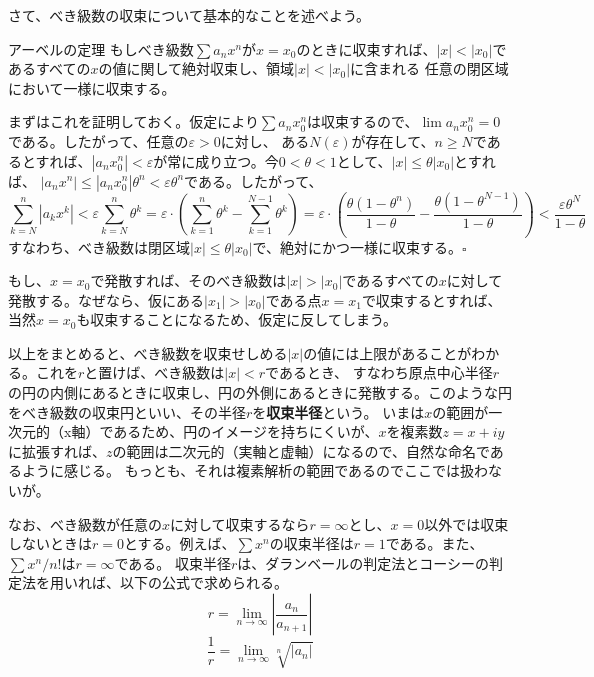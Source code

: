 \documentclass[a4j,dvipdfmx]{jsarticle}
\begin{document}
                さて、べき級数の収束について基本的なことを述べよう。
                \begin{itembox}{アーベルの定理}
                    もしべき級数$\sum a_nx^n$が$x=x_0$のときに収束すれば、$|x|<|x_0|$であるすべての$x$の値に関して絶対収束し、領域$|x|<|x_0|$に含まれる
                    任意の閉区域において一様に収束する。
                \end{itembox}
                まずはこれを証明しておく。仮定により$\sum a_nx_0^n$は収束するので、$\lim a_nx_0^n=0$である。したがって、任意の$\varepsilon>0$に対し、
                ある$N(\varepsilon)$が存在して、$n\geq N$であるとすれば、$|a_nx_0^n|<\varepsilon$が常に成り立つ。今$0<\theta<1$として、$|x|\leq \theta|x_0|$とすれば、
                $|a_nx^n|\leq |a_nx_0^n|\theta ^n<\varepsilon\theta^n$である。したがって、
                \begin{equation*}
                    \sum_{k=N}^{n} |a_kx^k|<\varepsilon\sum_{k=N}^n \theta^k =\varepsilon\cdot \left(\sum_{k=1}^{n}\theta^k-\sum_{k=1}^{N-1}\theta^k\right)=\varepsilon\cdot\left(\frac{\theta(1-\theta^n)}{1-\theta}-\frac{\theta(1-\theta^{N-1})}{1-\theta}\right)<\frac{\varepsilon\theta^N}{1-\theta}
                \end{equation*}
                すなわち、べき級数は閉区域$|x|\leq \theta|x_0|$で、絶対にかつ一様に収束する。$\square$

                もし、$x=x_0$で発散すれば、そのべき級数は$|x|>|x_0|$であるすべての$x$に対して発散する。なぜなら、仮にある$|x_1|>|x_0|$である点$x=x_1$で収束するとすれば、当然$x=x_0$も収束することになるため、仮定に反してしまう。

                以上をまとめると、べき級数を収束せしめる$|x|$の値には上限があることがわかる。これを$r$と置けば、べき級数は$|x|<r$であるとき、
                すなわち原点中心半径$r$の円の内側にあるときに収束し、円の外側にあるときに発散する。このような円をべき級数の収束円といい、その半径$r$を\textbf{収束半径}という。
                いまは$x$の範囲が一次元的（x軸）であるため、円のイメージを持ちにくいが、$x$を複素数$z=x+iy$に拡張すれば、$z$の範囲は二次元的（実軸と虚軸）になるので、自然な命名であるように感じる。
                もっとも、それは複素解析の範囲であるのでここでは扱わないが。

                なお、べき級数が任意の$x$に対して収束するなら$r=\infty$とし、$x=0$以外では収束しないときは$r=0$とする。例えば、$\sum x^n$の収束半径は$r=1$である。また、$\sum x^n/n!$は$r=\infty$である。
                \clearpage
                収束半径$r$は、ダランベールの判定法とコーシーの判定法を用いれば、以下の公式で求められる。
                \begin{equation}
                    r=\lim_{n\to\infty}\left|\frac{a_n}{a_{n+1}}\right|\label{eq:ダランベールの判定法と収束半径}
                \end{equation}
                \begin{equation}
                    \frac{1}{r}=\lim_{n\to\infty}\sqrt[n]{|a_n|}\label{eq:コーシーの判定法と収束半径}
                \end{equation}
\end{document}
